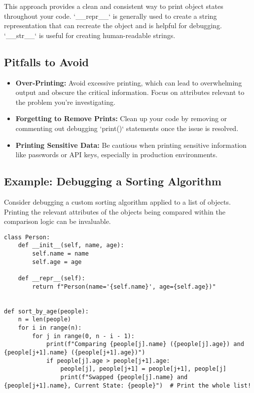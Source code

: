 \documentclass{article}
\begin{document}
{{{This approach provides a clean and consistent way to print object states throughout your code.  `__repr__` is generally used to create a string representation that can recreate the object and is helpful for debugging.  `__str__` is useful for creating human-readable strings.

\subsection*{Pitfalls to Avoid}

\begin{itemize}
    \item \textbf{Over-Printing:} Avoid excessive printing, which can lead to overwhelming output and obscure the critical information. Focus on attributes relevant to the problem you're investigating.
    \item \textbf{Forgetting to Remove Prints:}  Clean up your code by removing or commenting out debugging `print()` statements once the issue is resolved.
    \item \textbf{Printing Sensitive Data:} Be cautious when printing sensitive information like passwords or API keys, especially in production environments.
\end{itemize}

\subsection*{Example: Debugging a Sorting Algorithm}

Consider debugging a custom sorting algorithm applied to a list of objects.  Printing the relevant attributes of the objects being compared within the comparison logic can be invaluable.

\begin{verbatim}
class Person:
    def __init__(self, name, age):
        self.name = name
        self.age = age

    def __repr__(self):
        return f"Person(name='{self.name}', age={self.age})"


def sort_by_age(people):
    n = len(people)
    for i in range(n):
        for j in range(0, n - i - 1):
            print(f"Comparing {people[j].name} ({people[j].age}) and {people[j+1].name} ({people[j+1].age})")
            if people[j].age > people[j+1].age:
                people[j], people[j+1] = people[j+1], people[j]
                print(f"Swapped {people[j].name} and {people[j+1].name}, Current State: {people}")  # Print the whole list!
\end{verbatim}

}}}
\end{document}

